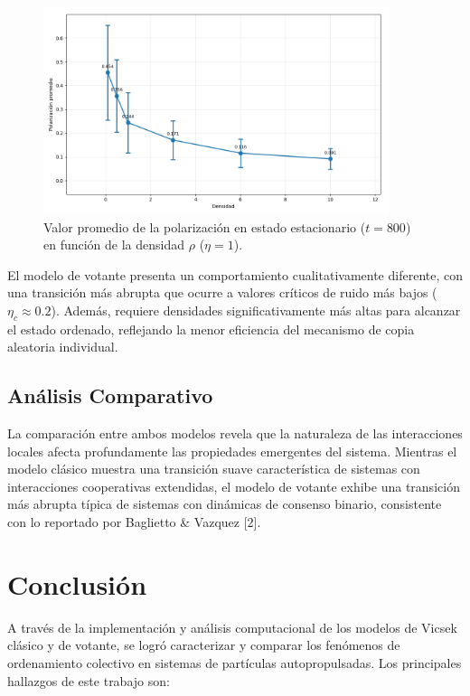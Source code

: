 \documentclass{article}
\begin{document}
\begin{figure}[H]
\centering
\includegraphics[width=0.9\textwidth]{Voter Ruido 1 variando densidad avg.png}
\caption{Valor promedio de la polarización en estado estacionario ($t  = 800$) en función de la densidad $\rho$ ($\eta = 1$).}
\label{fig:va_tiempo_densidad_voter1}
\end{figure}


El modelo de votante presenta un comportamiento cualitativamente diferente, con una transición más abrupta que ocurre a valores críticos de ruido más bajos ($\eta_c \approx 0.2$). Además, requiere densidades significativamente más altas para alcanzar el estado ordenado, reflejando la menor eficiencia del mecanismo de copia aleatoria individual.

\subsection{Análisis Comparativo}

La comparación entre ambos modelos revela que la naturaleza de las interacciones locales afecta profundamente las propiedades emergentes del sistema. Mientras el modelo clásico muestra una transición suave característica de sistemas con interacciones cooperativas extendidas, el modelo de votante exhibe una transición más abrupta típica de sistemas con dinámicas de consenso binario, consistente con lo reportado por Baglietto \& Vazquez [2].

\section{Conclusión}
A través de la implementación y análisis computacional de los modelos de Vicsek clásico y de votante, se logró caracterizar y comparar los fenómenos de ordenamiento colectivo en sistemas de partículas autopropulsadas. Los principales hallazgos de este trabajo son:
\end{document}
